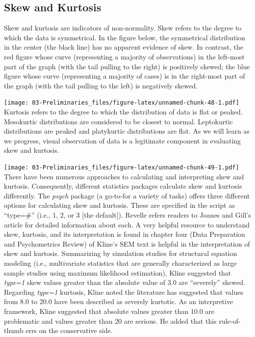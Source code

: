 \documentclass[
  11pt,
]{book}
\begin{document}
\hypertarget{skew-and-kurtosis}{%
\subsection{Skew and Kurtosis}\label{skew-and-kurtosis}}

Skew and kurtosis are indicators of non-normality. Skew refers to the degree to which the data is symmetrical. In the figure below, the symmetrical distribution in the center (the black line) has no apparent evidence of skew. In contrast, the red figure whose curve (representing a majority of observations) in the left-most part of the graph (with the tail pulling to the right) is positively skewed; the blue figure whose curve (representing a majority of cases) is in the right-most part of the graph (with the tail pulling to the left) is negatively skewed.

\texttt{[image: 03-Preliminaries\_files/figure-latex/unnamed-chunk-48-1.pdf]} Kurtosis refers to the degree to which the distribution of data is flat or peaked. Mesokurtic distributions are considered to be closest to normal. Leptokurtic distributions are peaked and platykurtic distributions are flat. As we will learn as we progress, visual observation of data is a legitimate component in evaluating skew and kurtosis.

\texttt{[image: 03-Preliminaries\_files/figure-latex/unnamed-chunk-49-1.pdf]} There have been numerous approaches to calculating and interpreting skew and kurtosis. Consequently, different statistics packages calculate skew and kurtosis differently. The \emph{psych} package (a go-to-for a variety of tasks) offers three different options for calculating skew and kurtosis. These are specified in the script as ``type=\#'' (i.e., 1, 2, or 3 {[}the default{]}). Revelle \citeyearpar{revelle_introduction_2021} refers readers to Joanes and Gill's \citeyearpar{joanes_comparing_1998} article for detailed information about each. A very helpful resource to understand skew, kurtosis, and its interpretation is found in chapter four (Data Preparation and Psychometrics Review) of Kline's \citeyearpar{kline_data_2016} SEM text is helpful in the interpretation of skew and kurtosis. Summarizing by simulation studies for structural equation modeling (i.e., multivariate statistics that are generally characterized as large sample studies using maximum likelihood estimation), Kline suggested that \emph{type=1} skew values greater than the absolute value of 3.0 are ``severely'' skewed. Regarding \emph{type=1} kurtosis, Kline noted the literature has suggested that values from 8.0 to 20.0 have been described as severely kurtotic. As an interpretive framework, Kline suggested that absolute values greater than 10.0 are problematic and values greater than 20 are serious. He added that this rule-of-thumb errs on the conservative side.
\end{document}

